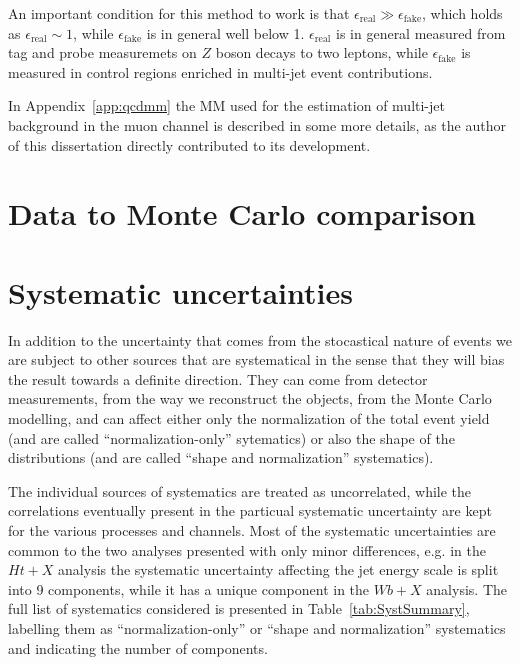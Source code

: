 An important condition for this method to work is that 
$\epsilon_\mathrm{real} \gg \epsilon_\mathrm{fake}$, which 
holds as $\epsilon_\mathrm{real}\sim 1$, while $\epsilon_\mathrm{fake}$
is in general well below 1.
$\epsilon_\mathrm{real}$ is in general measured from
tag and probe measuremets on $Z$ boson decays to two leptons,
while $\epsilon_\mathrm{fake}$ is measured in control regions
enriched in multi-jet event contributions.

In Appendix~\ref{app:qcdmm} the MM used for the estimation
of multi-jet background in the muon channel is
described in some more details, as the author of this dissertation
directly contributed to its development.


\section{Data to Monte Carlo comparison}\label{sec:datamcpresel}






\section{Systematic uncertainties}\label{sec:systematics}

In addition to the uncertainty that comes from the stocastical nature
of events we are subject to other sources that are systematical in the sense
that they will bias the result towards a definite direction. They can come from
detector measurements, from the way we reconstruct the objects, from the Monte
Carlo modelling, and can affect either only the normalization of the total event
yield (and are called ``normalization-only'' sytematics) or also the shape 
of the distributions (and are called ``shape and normalization'' systematics).

The individual sources of systematics are treated as uncorrelated, while
the correlations eventually present in the particual systematic uncertainty are 
kept for the various processes and channels. Most of the systematic uncertainties
are common to the two analyses presented with only minor differences, e.g. in the
$Ht+X$ analysis the systematic uncertainty affecting the jet energy scale is
split into 9 components, while it has a unique component in the $Wb+X$ analysis. 
The full list of systematics considered is presented in 
Table~\ref{tab:SystSummary}, labelling them as  ``normalization-only'' 
or ``shape and normalization'' systematics and indicating the number of components.

